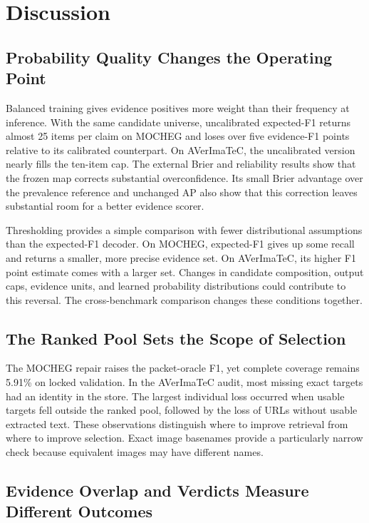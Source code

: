 \section{Discussion}
\label{sec:discussion}

\subsection{Probability Quality Changes the Operating Point}

Balanced training gives evidence positives more weight than their frequency at inference. With the same candidate universe, uncalibrated expected-F1 returns almost 25 items per claim on MOCHEG and loses over five evidence-F1 points relative to its calibrated counterpart. On AVerImaTeC, the uncalibrated version nearly fills the ten-item cap. The external Brier and reliability results show that the frozen map corrects substantial overconfidence. Its small Brier advantage over the prevalence reference and unchanged AP also show that this correction leaves substantial room for a better evidence scorer.

Thresholding provides a simple comparison with fewer distributional assumptions than the expected-F1 decoder. On MOCHEG, expected-F1 gives up some recall and returns a smaller, more precise evidence set. On AVerImaTeC, its higher F1 point estimate comes with a larger set. Changes in candidate composition, output caps, evidence units, and learned probability distributions could contribute to this reversal. The cross-benchmark comparison changes these conditions together.

\subsection{The Ranked Pool Sets the Scope of Selection}

The MOCHEG repair raises the packet-oracle F1, yet complete coverage remains 5.91\% on locked validation. In the AVerImaTeC audit, most missing exact targets had an identity in the store. The largest individual loss occurred when usable targets fell outside the ranked pool, followed by the loss of URLs without usable extracted text. These observations distinguish where to improve retrieval from where to improve selection. Exact image basenames provide a particularly narrow check because equivalent images may have different names.

\subsection{Evidence Overlap and Verdicts Measure Different Outcomes}

